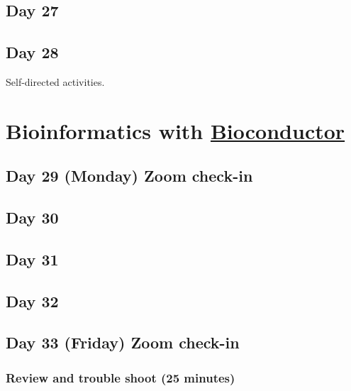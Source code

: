 \documentclass[
]{book}
\begin{document}
\hypertarget{day-27}{%
\section{Day 27}\label{day-27}}

\hypertarget{day-28}{%
\section{Day 28}\label{day-28}}

Self-directed activities.

\hypertarget{five}{%
\chapter{\texorpdfstring{Bioinformatics with \href{https://bioconductor.org}{Bioconductor}}{Bioinformatics with Bioconductor}}\label{five}}

\hypertarget{day-29-monday-zoom-check-in}{%
\section{Day 29 (Monday) Zoom check-in}\label{day-29-monday-zoom-check-in}}

\hypertarget{day-30}{%
\section{Day 30}\label{day-30}}

\hypertarget{day-31}{%
\section{Day 31}\label{day-31}}

\hypertarget{day-32}{%
\section{Day 32}\label{day-32}}

\hypertarget{day-33-friday-zoom-check-in}{%
\section{Day 33 (Friday) Zoom check-in}\label{day-33-friday-zoom-check-in}}

\hypertarget{review-and-trouble-shoot-25-minutes-2}{%
\subsection{Review and trouble shoot (25 minutes)}\label{review-and-trouble-shoot-25-minutes-2}}
\end{document}

